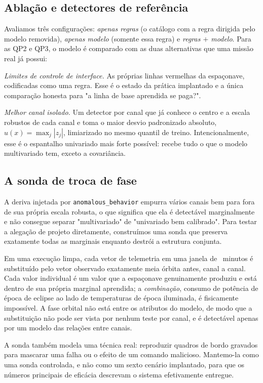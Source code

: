 \documentclass[conference]{IEEEtran}
\begin{document}
\subsection{Ablação e detectores de referência}

Avaliamos três configurações: \emph{apenas regras} (o catálogo com a regra
dirigida pelo modelo removida), \emph{apenas modelo} (somente essa regra) e
\emph{regras $+$ modelo}. Para as QP2 e QP3, o modelo é comparado com as duas
alternativas que uma missão real já possui:

\emph{Limites de controle de interface.} As próprias linhas vermelhas da
espaçonave, codificadas como uma regra. Esse é o estado da prática implantado e
a única comparação honesta para "a linha de base aprendida se paga?".

\emph{Melhor canal isolado.} Um detector por canal que já conhece o centro e a
escala robustos de cada canal e toma o maior desvio padronizado absoluto,
$u(x) = \max_j |z_j|$, limiarizado no mesmo quantil de treino.
Intencionalmente, esse é o espantalho univariado mais forte possível: recebe
tudo o que o modelo multivariado tem, exceto a covariância.

\subsection{A sonda de troca de fase}
\label{sec:probe}

A deriva injetada por \texttt{anomalous\_behavior} empurra vários canais bem
para fora de sua própria escala robusta, o que significa que ela é detectável
marginalmente e não consegue separar "multivariado" de "univariado bem
calibrado". Para testar a alegação de projeto diretamente, construímos uma sonda
que preserva exatamente todas as marginais enquanto destrói a estrutura
conjunta.

Em uma execução limpa, cada vetor de telemetria em uma janela de
\expSwapWindowMin~minutos é substituído pelo vetor observado exatamente meia
órbita antes, canal a canal. Cada valor individual é um valor que a espaçonave
genuinamente produziu e está dentro de sua própria marginal aprendida; a
\emph{combinação}, consumo de potência de época de eclipse ao lado de
temperaturas de época iluminada, é fisicamente impossível. A fase orbital não
está entre os atributos do modelo, de modo que a substituição não pode ser vista por
nenhum teste por canal, e é detectável apenas por um modelo das relações entre
canais.

A sonda também modela uma técnica real: reproduzir quadros de bordo gravados
para mascarar uma falha ou o efeito de um comando malicioso. Mantemo-la como uma
sonda controlada, e não como um sexto cenário implantado, para que os números
principais de eficácia descrevam o sistema efetivamente entregue.
\end{document}
